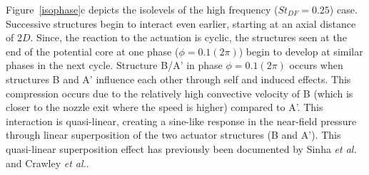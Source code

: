 \documentclass[english]{aiaa-tc}
\begin{document}
Figure~\ref{isophase}c depicts the isolevels of the high frequency
($St_{DF}=0.25$) case.  Successive structures begin to interact even
earlier, starting at an axial distance of $2D$.  Since, the reaction
to the actuation is cyclic, the structures seen at the end of the
potential core at one phase ($\phi=0.1(2\pi)$) begin to develop at
similar phases in the next cycle. Structure B/A' in phase
$\phi=0.1(2\pi)$ occurs when structures B and A' influence each other
through self and induced effects. This compression occurs due to the
relatively high convective velocity of B (which is closer to the
nozzle exit where the speed is higher) compared to A'. This
interaction is quasi-linear, creating a sine-like response in the
near-field pressure through linear superposition of the two
actuator structures (B and A'). This quasi-linear superposition effect
has previously been documented by Sinha {\em et al.}\cite{sinha2013}
and Crawley {\em et 
  al.}\cite{Crawley2014}.
\end{document}
